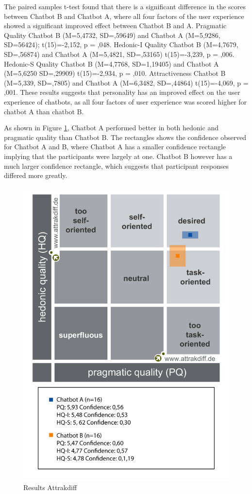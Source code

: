 The paired samples t-test found that there is a significant difference in the scores between Chatbot B and Chatbot A, where all four factors of the user experience showed a significant improved effect between Chatbot B and A. Pragmatic Quality Chatbot B (M=5,4732, SD=,59649) and Chatbot A (M=5,9286, SD=56424); t(15)=-2,152, p = ,048. Hedonic-I Quality Chatbot B (M=4,7679, SD=,56874) and Chatbot A (M=5,4821, SD=,53165) t(15)=-3,239, p = ,006. Hedonic-S Quality Chatbot B (M=4,7768, SD=1,19405) and Chatbot A (M=5,6250 SD=,29909) t(15)=-2,934, p = ,010. Attractiveness Chatbot B (M=5,339, SD=,7805) and Chatbot A (M=6,3482, SD=,44864) t(15)=-4,069, p = ,001. These results suggests that personality has an improved effect on the user experience of chatbots, as all four factors of user experience was scored higher for chatbot A than chatbot B.

As shown in Figure \ref{fig:portres}, Chatbot A performed better in both hedonic and pragmatic quality than Chatbot B. The rectangles shows the confidence observed for Chatbot A and B, where Chatbot A has a smaller confidence rectangle implying that the participants were largely at one. Chatbot B however has a much larger confidence rectangle, which suggests that participant responses differed more greatly. 

\begin{figure}[h]
    \centering
    \includegraphics[scale=0.4]{figures/Portfolio-of-results-attrakdiff.png}
    \caption{Results Attrakdiff}
    \label{fig:portres}
\end{figure}
        
